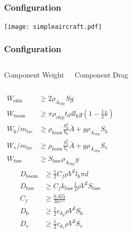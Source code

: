 \documentclass{beamer}
\begin{document}
\begin{frame}
    \frametitle{Configuration}

    \begin{center}
    \texttt{[image: simpleaircraft.pdf]}
    \end{center}

\end{frame}

\begin{frame}
    \frametitle{Configuration}
    
    \begin{columns}
        \begin{center}
        Component Weight
        \end{center}
        \begin{center}
        Component Drag
        \end{center}
    \end{columns}

    \begin{columns}
        \scriptsize
        \begin{align*}
        W_{\text{skin}} &\geq 2 \rho_{A_{\text{cfrp}}} S g \\
        W_{\text{boom}} &\geq \pi \rho_{\text{cfrp}} t_0 d l_{\text{h}}g \left( 1 - \frac{1}{2} k\right) \\
        W_{\text{h}}/m_{\text{fac}} &\geq \rho_{\text{foam}} \frac{S_{\text{h}}^2}{b_{\text{h}}} \bar{A} + g\rho_{A_{\text{cfrp}}} S_{\text{h}} \\
        W_{\text{v}}/m_{\text{fac}} &\geq \rho_{\text{foam}} \frac{S_{\text{v}}^2}{b_{\text{v}}} \bar{A} + g\rho_{A_{\text{cfrp}}} S_{\text{v}} \\
            W_{\text{fuse}} &\geq S_{\text{fuse}} \rho_{A_{\text{cfrp}}} g
        \end{align*}
        \scriptsize
        \begin{align*}
        D_{\text{boom}} &\geq \frac{1}{2} C_f \rho V^2 l_{\text{h}}\pi d \\
        D_{\text{fuse}} &\geq C_f k_{\text{fuse}} \frac{1}{2} \rho V^2 S_{\text{fuse}} \\
        C_f &\geq \frac{0.455}{Re^{0.3}} \\
        D_{\text{h}} &\geq \frac{1}{2} c_{d_{\text{h}}} \rho V^2 S_{\text{h}} \\
        D_{\text{v}} &\geq \frac{1}{2} c_{d_{\text{v}}} \rho V^2 S_{\text{v}} 
        \end{align*}
    \end{columns}

\end{frame}
\end{document}
